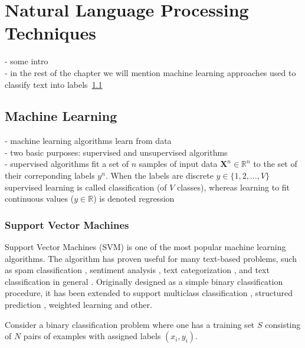 \chapter{Natural Language Processing Techniques}

- some intro \\

- in the rest of the chapter we will mention machine learning
approaches used to classify text into labels~\ref{sec:machine_learning}


\section{Machine Learning}
\label{sec:machine_learning}

- machine learning algorithms learn from data \\
- two basic purposes: supervised and unsupervised algorithms \\
- supervised algorithms fit a set of $n$ samples of 
input data $\textbf{X}^n \in \mathbb{R}^n$ to the set of their correponding 
labels $y^n $. When the labels are discrete $y \in \{1, 2, \dots , V\}$ 
supervised learning is called classification (of $V$ classes), 
whereas learning to fit continuous values ($y \in \mathbb{R}$) 
is denoted regression \\

\subsection{Support Vector Machines}

Support Vector Machines (SVM) \citep{cortes1995support} is one of the most
popular machine learning algorithms. The algorithm has proven useful for many
text-based problems, such as spam classification \citep{drucker1999support},
sentiment analysis \citep{wang2012baselines}, text categorization
\citep{joachims1998text}, and text classification in general
\citep{tong2001support, ikonomakis2005text}. Originally designed as a simple
binary classification procedure, it has been extended to support multiclass
classification \citep{weston1998multi}, structured prediction
\citep{tsochantaridis2005large}, weighted learning \citep{huang2005weighted} and
other. 

Consider a binary classification problem where one has
a training set $S$ consisting of $N$ pairs of examples with assigned labels
$(x_i, y_i)$.

